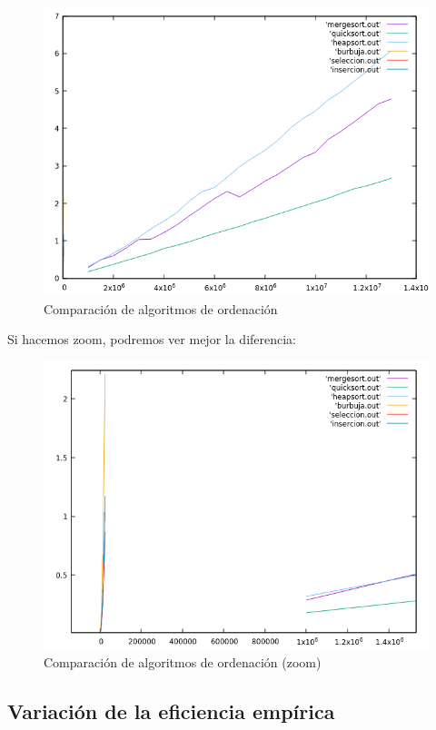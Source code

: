 \documentclass[12pt,spanish]{article}
\begin{document}
\begin{figure}[H]
\centering
\includegraphics[scale=0.75]{empirica_ordenacion_comparacion.png}
\caption{Comparación de algoritmos de ordenación}
\end{figure}
Si hacemos zoom, podremos ver mejor la diferencia:

\begin{figure}[H]
\centering
\includegraphics[scale=0.75]{empirica_ordenacion_comparacion_zoom.png}
\caption{Comparación de algoritmos de ordenación (zoom)}
\end{figure}
\subsection{Variación de la eficiencia empírica}
\end{document}
